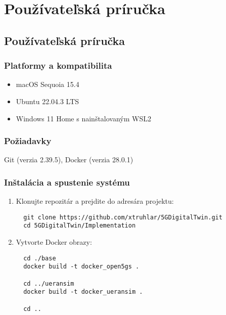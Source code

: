 \setcounter{figure}{0}
\setcounter{listing}{0}

\chapter{Používateľská príručka}
\label{appendix:userguide}
\renewcommand*{\thepage}{B-\arabic{page}}

\begin{refsegment}

\section*{Používateľská príručka}

\subsection*{Platformy a kompatibilita}
\begin{itemize}
  \item macOS Sequoia 15.4
  \item Ubuntu 22.04.3 LTS
  \item Windows 11 Home s nainštalovaným WSL2
\end{itemize}

\subsection*{Požiadavky}
Git (verzia 2.39.5), Docker (verzia 28.0.1)


\subsection*{Inštalácia a spustenie systému}
\begin{enumerate}
  \item Klonujte repozitár a prejdite do adresára projektu:
  \begin{verbatim}
  git clone https://github.com/xtruhlar/5GDigitalTwin.git
  cd 5GDigitalTwin/Implementation
  \end{verbatim}

  \item Vytvorte Docker obrazy:
  \begin{verbatim}
  cd ./base
  docker build -t docker_open5gs .

  cd ../ueransim
  docker build -t docker_ueransim .

  cd ..
  \end{verbatim}


\end{enumerate}
\end{refsegment}
